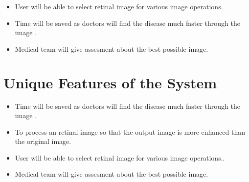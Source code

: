 \begin{itemize}
	\item User will be able to select retinal image for various image operations.

	\item Time will be saved as doctors will find the disease much faster through the image  .
	
	\item Medical team will give assesment about the best possible image.   
	
	
	


\end{itemize}

 
\section{Unique Features of the System}
\begin{itemize}

\item Time will be saved as doctors will find the disease much faster through the image  .
\item To process an retinal image so that the output image is more enhanced than the original image.

\item User will be able to select retinal image for various image operations..

\item Medical team will give assesment about the best possible image.

\end{itemize}


